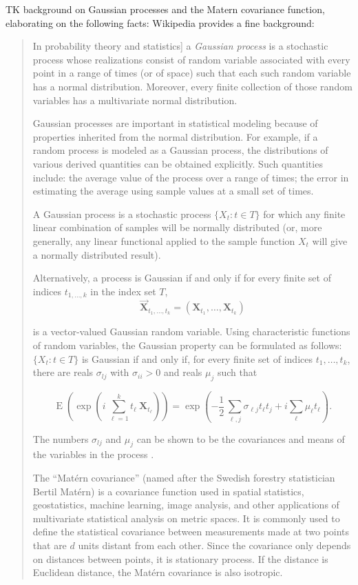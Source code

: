 TK background on Gaussian processes and the Matern covariance
function, elaborating on the following facts: Wikipedia provides a fine background:
\begin{quote}
In probability theory and statistics] a \emph{Gaussian process} is a
  stochastic process whose realizations consist of random variable
  associated with every point in a range of times (or of space) such
  that each such random variable has a normal distribution. Moreover,
  every finite collection of those random variables has a multivariate
  normal distribution.

Gaussian processes are important in statistical modeling because
of properties inherited from the normal distribution. For example, if
a random process is modeled as a Gaussian process, the distributions
of various derived quantities can be obtained explicitly. Such
quantities include: the average value of the process over a range of
times; the error in estimating the average using sample values at a
small set of times.

A Gaussian process is a stochastic process $\{X_t : t \in T\}$ for
which any finite linear combination of samples will be normally
distributed (or, more generally, any linear functional applied to the
sample function $X_t$ will give a normally distributed result).

Alternatively, a process is Gaussian if and only if for every finite
set of indices $t_{1,\ldots,k}$ in the index set $T$,
\[
 \vec{\mathbf{X}}_{t_1, \ldots, t_k} = (\mathbf{X}_{t_1}, \ldots, \mathbf{X}_{t_k})
\]

is a vector-valued Gaussian
random variable. Using characteristic functions of random variables, the
Gaussian property can be formulated as
follows: $\{X_t : t \in T\}$
is Gaussian if and only if, for every finite set of indices
$t_1, \ldots, t_k$, there are reals
$\sigma_{l j}$ with $\sigma_{ii} > 0$ and reals
$\mu_j$ such that

\[
\operatorname{E}\left(\exp\left(i \ \sum_{\ell=1}^k t_\ell
\ \mathbf{X}_{t_\ell}\right)\right) = \exp \left(-\frac{1}{2} \,
\sum_{\ell, j} \sigma_{\ell j} t_\ell t_j + i \sum_\ell \mu_\ell
t_\ell\right).
\]

The numbers $\sigma_{lj}$ and $\mu_j$ can be shown to be the
covariances and means of the variables in
the process \cite{WP:GP}.

The ``Mat\'{e}rn covariance'' (named after the Swedish forestry
statistician Bertil Mat\'{e}rn) is a covariance function used in
spatial statistics, geostatistics, machine learning, image analysis,
and other applications of multivariate statistical analysis on metric
spaces. It is commonly used to define the statistical covariance
between measurements made at two points that are $d$ units distant
from each other. Since the covariance only depends on distances
between points, it is stationary process. If the distance is Euclidean
distance, the Mat\'{e}rn covariance is also isotropic.


\end{quote}
